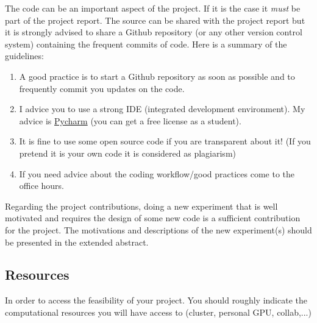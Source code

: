 \documentclass{article}
\begin{document}
The code can be an important aspect of the project. If it is the case it \emph{must} be part of the project report. The source can be shared with the project report but it is strongly advised to share a Github repository (or any other version control system) containing the frequent commits of code. Here is a summary of the guidelines:
\begin{enumerate}
    \item A good practice is to start a Github repository as soon as possible and to frequently commit you updates on the code.
    \item I advice you to use a strong IDE (integrated development environment). My advice is \href{https://www.jetbrains.com/community/education/#students}{Pycharm} (you can get a free license as a student). 
    \item It is fine to use some open source code if you are transparent about it! (If you pretend it is your own code it is considered as plagiarism) 
    \item 
	If you need advice about the coding workflow/good practices come to the office hours.
\end{enumerate}

Regarding the project contributions, doing a new experiment that is well motivated and requires the design of some new code is a sufficient contribution for the project. The motivations and descriptions of the new experiment(s) should be presented in the extended abstract.

\subsection{Resources}

In order to access the feasibility of your project. You should roughly indicate the computational resources you will have access to (cluster, personal GPU, collab,...)

\end{document}
